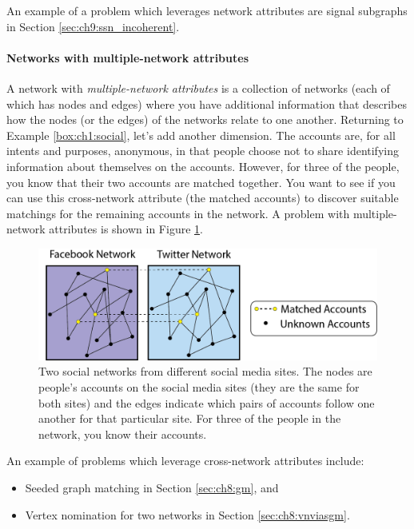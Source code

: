 An example of a problem which leverages network attributes are signal subgraphs in Section \ref{sec:ch9:ssn_incoherent}.


\paragraph{Networks with multiple-network attributes}

A network with \textit{multiple-network attributes} is a collection of networks (each of which has nodes and edges) where you have additional information that describes how the nodes (or the edges) of the networks relate to one another. Returning to Example \ref{box:ch1:social}, let's add another dimension. The accounts are, for all intents and purposes, anonymous, in that people choose not to share identifying information about themselves on the accounts. However, for three of the people, you know that their two accounts are {matched} together. You want to see if you can use this cross-network attribute (the {matched accounts}) to discover suitable matchings for the remaining accounts in the network. A problem with multiple-network attributes is shown in Figure \ref{fig:ch1:netmultiattr}.

\begin{figure}[h]
\includegraphics[width=\linewidth]{foundations/ch1/Images/crossnetattr_ex.png}
\caption[Multiple network attributes]{Two social networks from different social media sites. The nodes are people’s accounts on the social media sites (they are the same for both sites) and the edges indicate which pairs of accounts follow one another for that particular site. For three of the people in the network, you know their accounts.}
\label{fig:ch1:netmultiattr}
\end{figure}


An example of problems which leverage cross-network attributes include:
\begin{itemize}
\item Seeded graph matching in Section \ref{sec:ch8:gm}, and
\item Vertex nomination for two networks in Section \ref{sec:ch8:vnviasgm}.
\end{itemize}

